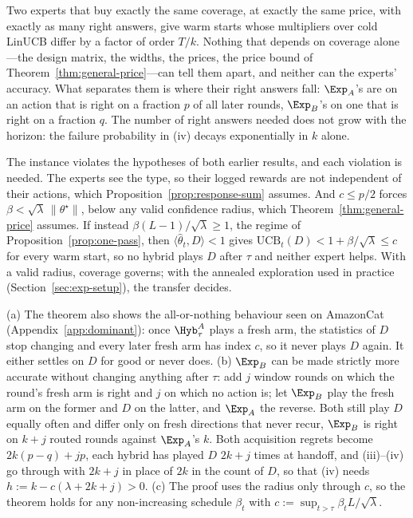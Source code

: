 Two experts that buy exactly the same coverage, at exactly the same price,
with exactly as many right answers, give warm starts whose multipliers over
cold LinUCB differ by a factor of order $T/k$. Nothing that depends on
coverage alone---the design matrix, the widths, the prices, the price bound of
Theorem~\ref{thm:general-price}---can tell them apart, and neither can the
experts' accuracy. What separates them is where their right answers fall:
$\Exp_A$'s are on an action that is right on a fraction $p$ of all later
rounds, $\Exp_B$'s on one that is right on a fraction $q$. The number of right
answers needed does not grow with the horizon: the failure probability in (iv)
decays exponentially in $k$ alone.

\begin{remark}
\label{rem:transfer-regime}
The instance violates the hypotheses of both earlier results, and each
violation is needed. The experts see the type, so their logged rewards are not
independent of their actions, which Proposition~\ref{prop:response-sum}
assumes. And $c\le p/2$ forces $\beta<\sqrt\lambda\,\|\theta^\star\|$, below
any valid confidence radius, which Theorem~\ref{thm:general-price} assumes.
If instead $\beta(L-1)/\sqrt\lambda\ge1$, the regime of
Proposition~\ref{prop:one-pass}, then $\langle\widehat\theta_t,D\rangle<1$
gives $\mathrm{UCB}_t(D)<1+\beta/\sqrt\lambda\le c$ for every warm start, so no
hybrid plays $D$ after $\tau$ and neither expert helps. With a valid radius,
coverage governs; with the annealed exploration used in practice
(Section~\ref{sec:exp-setup}), the transfer decides.
\end{remark}

\begin{remark}
\label{rem:transfer-extensions}
(a) The theorem also shows the all-or-nothing behaviour seen on AmazonCat
(Appendix~\ref{app:dominant}): once $\Hyb^A_\tau$ plays a fresh arm, the
statistics of $D$ stop changing and every later fresh arm has index $c$, so it
never plays $D$ again. It either settles on $D$ for good or never does.
(b) $\Exp_B$ can be made strictly more accurate without changing anything
after $\tau$: add $j$ window rounds on which the round's fresh arm is right and
$j$ on which no action is; let $\Exp_B$ play the fresh arm on the former and
$D$ on the latter, and $\Exp_A$ the reverse. Both still play $D$ equally often
and differ only on fresh directions that never recur, $\Exp_B$ is right on
$k+j$ routed rounds against $\Exp_A$'s $k$. Both acquisition regrets become
$2k(p-q)+jp$, each hybrid has played $D$ $2k+j$ times at handoff, and
(iii)--(iv) go through with $2k+j$ in place of $2k$ in the count of $D$, so
that (iv) needs $h:=k-c(\lambda+2k+j)>0$.
(c) The proof uses the radius only through $c$, so the theorem holds for any
non-increasing schedule $\beta_t$ with $c:=\sup_{t>\tau}\beta_tL/\sqrt\lambda$.
\end{remark}

